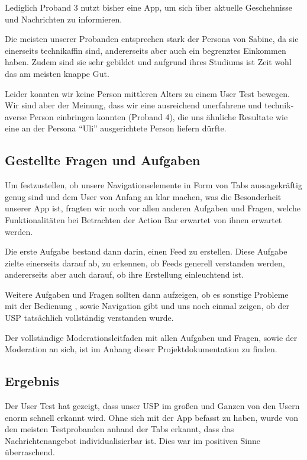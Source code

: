 Lediglich Proband 3 nutzt bisher eine App, um sich über aktuelle Geschehnisse und Nachrichten zu informieren.

Die meisten unserer Probanden entsprechen stark der Persona von Sabine, da sie einerseits technikaffin sind, andererseits aber auch ein begrenztes Einkommen haben. Zudem sind sie sehr gebildet und aufgrund ihres Studiums ist Zeit wohl das am meisten knappe Gut.

Leider konnten wir keine Person mittleren Alters zu einem User Test bewegen. Wir sind aber der Meinung, dass wir eine ausreichend unerfahrene und technik-averse Person einbringen konnten (Proband 4), die uns ähnliche Resultate wie eine an der Persona \enquote{Uli} ausgerichtete Person liefern dürfte.

\subsection{Gestellte Fragen und Aufgaben}

Um festzustellen, ob unsere Navigationselemente in Form von Tabs aussagekräftig genug sind und dem User von Anfang an klar machen, was die Besonderheit unserer App ist, fragten wir noch vor allen anderen Aufgaben und Fragen, welche Funktionalitäten bei Betrachten der Action Bar erwartet von ihnen erwartet werden.

Die erste Aufgabe bestand dann darin, einen Feed zu erstellen. Diese Aufgabe zielte einerseits darauf ab, zu erkennen, ob Feeds generell verstanden werden, andererseits aber auch darauf, ob ihre Erstellung einleuchtend ist.

Weitere Aufgaben und Fragen sollten dann aufzeigen, ob es sonstige Probleme mit der Bedienung , sowie Navigation gibt und uns noch einmal zeigen, ob der USP tatsächlich vollständig verstanden wurde.

Der vollständige Moderationsleitfaden mit allen Aufgaben und Fragen, sowie der Moderation an sich, ist im Anhang dieser Projektdokumentation zu finden.

\subsection{Ergebnis}

Der User Test hat gezeigt, dass unser USP im großen und Ganzen von den Usern enorm schnell erkannt wird. Ohne sich mit der App befasst zu haben, wurde von den meisten Testprobanden anhand der Tabs erkannt, dass das Nachrichtenangebot individualisierbar ist. Dies war im positiven Sinne überraschend.

